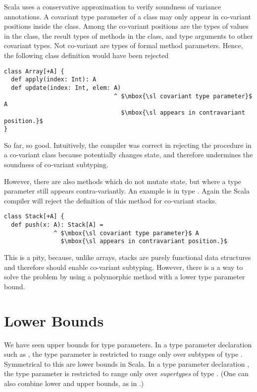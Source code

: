 Scala uses a conservative approximation to verify soundness of
variance annotations.  A covariant type parameter of a class may only
appear in co-variant positions inside the class.  Among the co-variant
positions are the types of values in the class, the result types of
methods in the class, and type arguments to other covariant types. Not
co-variant are types of formal method parameters. Hence, the following
class definition would have been rejected
\begin{lstlisting}
class Array[+A] {
  def apply(index: Int): A
  def update(index: Int, elem: A)
                               ^ $\mbox{\sl covariant type parameter}$ A
                                 $\mbox{\sl appears in contravariant position.}$
}
\end{lstlisting}
So far, so good. Intuitively, the compiler was correct in rejecting
the  procedure in a co-variant class because 
potentially changes state, and therefore undermines the soundness of
co-variant subtyping. 

However, there are also methods which do not mutate state, but where a
type parameter still appears contra-variantly. An example is
 in type . Again the Scala compiler will reject
the definition of this method for co-variant stacks.
\begin{lstlisting}
class Stack[+A] {
  def push(x: A): Stack[A] =
              ^ $\mbox{\sl covariant type parameter}$ A
                $\mbox{\sl appears in contravariant position.}$
\end{lstlisting}
This is a pity, because, unlike arrays, stacks are purely functional data
structures and therefore should enable co-variant subtyping. However,
there is a a way to solve the problem by using a polymorphic method
with a lower type parameter bound.

\section{Lower Bounds}

We have seen upper bounds for type parameters. In a type parameter
declaration such as , the type parameter  is
restricted to range only over subtypes of type . Symmetrical
to this are lower bounds in Scala. In a type parameter declaration
, the type parameter  is restricted to range only
over {\em supertypes} of type . (One can also combine lower and
upper bounds, as in .)

